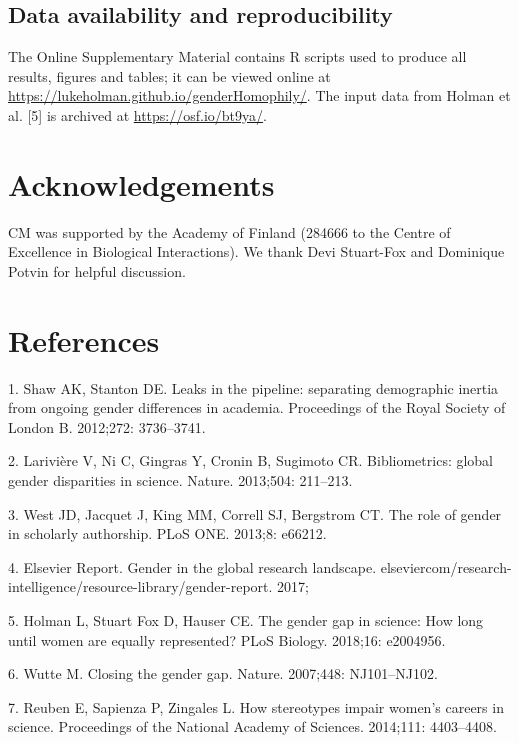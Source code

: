 \documentclass[12pt,]{article}
\begin{document}
\subsection{Data availability and
reproducibility}\label{data-availability-and-reproducibility}

The Online Supplementary Material contains R scripts used to produce all
results, figures and tables; it can be viewed online at
\url{https://lukeholman.github.io/genderHomophily/}. The input data from
Holman et al. {[}5{]} is archived at \url{https://osf.io/bt9ya/}.

\section{Acknowledgements}\label{acknowledgements}

CM was supported by the Academy of Finland (284666 to the Centre of
Excellence in Biological Interactions). We thank Devi Stuart-Fox and
Dominique Potvin for helpful discussion.

\section{References}\label{references}

\hypertarget{refs}{}
\hypertarget{ref-Shaw_2012}{}
1. Shaw AK, Stanton DE. Leaks in the pipeline: separating demographic
inertia from ongoing gender differences in academia. Proceedings of the
Royal Society of London B. 2012;272: 3736--3741.

\hypertarget{ref-Lariviere_2013}{}
2. Larivière V, Ni C, Gingras Y, Cronin B, Sugimoto CR. Bibliometrics:
global gender disparities in science. Nature. 2013;504: 211--213.

\hypertarget{ref-West_2013}{}
3. West JD, Jacquet J, King MM, Correll SJ, Bergstrom CT. The role of
gender in scholarly authorship. PLoS ONE. 2013;8: e66212.

\hypertarget{ref-Elsevier_report}{}
4. Elsevier Report. Gender in the global research landscape.
elseviercom/research-intelligence/resource-library/gender-report. 2017;

\hypertarget{ref-Holman_2018}{}
5. Holman L, Stuart Fox D, Hauser CE. The gender gap in science: How
long until women are equally represented? PLoS Biology. 2018;16:
e2004956.

\hypertarget{ref-Wutte_2007}{}
6. Wutte M. Closing the gender gap. Nature. 2007;448: NJ101--NJ102.

\hypertarget{ref-Reuben_2014}{}
7. Reuben E, Sapienza P, Zingales L. How stereotypes impair women's
careers in science. Proceedings of the National Academy of Sciences.
2014;111: 4403--4408.
\end{document}
